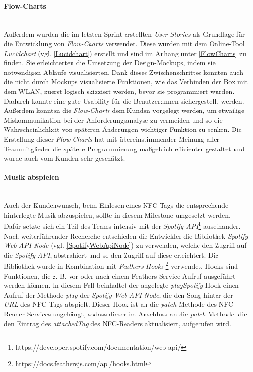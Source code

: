\documentclass[10pt, a4paper]{article}
\begin{document}
\begin{onehalfspace}
\paragraph*{Flow-Charts} $~$ \\
Außerdem wurden die im letzten Sprint erstellten \textit{User Stories} als Grundlage für die Entwicklung von \textit{Flow-Charts} verwendet.
Diese wurden mit dem Online-Tool \textit{Lucidchart} (vgl. \autoref*{Lucidchart}) erstellt und sind im Anhang unter \autoref*{FlowCharts} zu finden.
Sie erleichterten die Umsetzung der Design-Mockups, indem sie notwendigen Abläufe visualisierten.
Dank dieses Zwischenschrittes konnten auch die nicht durch Mockups visualisierte Funktionen, wie das Verbinden der Box mit dem WLAN, zuerst logisch skizziert
werden, bevor sie programmiert wurden. Dadurch konnte eine gute Usability
für die Benutzer:innen sichergestellt werden. Außerdem konnten die \textit{Flow-Charts} dem Kunden vorgelegt werden, um etwailige Miskommunikation bei der Anforderungsanalyse zu vermeiden
und so die Wahrscheinlichkeit von späteren Änderungen wichtiger Funktion zu senken. Die Erstellung dieser \textit{Flow-Charts} hat mit übereinstimmender
Meinung aller Teammitglieder die spätere Programmierung maßgeblich effizienter gestaltet und wurde auch vom Kunden sehr geschätzt.


\paragraph*{Musik abspielen} $~$ \\
Auch der Kundenwunsch, beim Einlesen eines NFC-Tags die entsprechende hinterlegte Musik abzuspielen, sollte in diesem Milestone umgesetzt werden.
Dafür setzte sich ein Teil des Teams intensiv mit der \textit{Spotify-API}\footnote{https://developer.spotify.com/documentation/web-api/} auseinander.
Nach weiterführender Recherche entschieden die Entwickler die Bibliothek \textit{Spotify Web API Node} (vgl. \autoref*{SpotifyWebApiNode}) zu verwenden, welche den Zugriff auf die \textit{Spotify-API},
abstrahiert und so den Zugriff auf diese erleichtert. Die Bibliothek wurde in Kombination mit \textit{Feathers-Hooks}
\footnote{https://docs.feathersjs.com/api/hooks.html} verwendet. Hooks sind Funktionen, die z. B. vor oder nach einem Feathers Service Aufruf ausgeführt werden
können. In diesem Fall beinhaltet der angelegte \textit{playSpotify} Hook einen Aufruf der Methode \textit{play} der \textit{Spotify Web API Node}, die den Song
hinter der \textit{URL} des NFC-Tags abspielt. Dieser Hook ist an die \textit{patch} Methode des NFC-Reader Services angehängt, sodass dieser im
Anschluss an die \textit{patch} Methode, die den Eintrag des \textit{attachedTag} des NFC-Readers aktualisiert, aufgerufen wird.


\end{onehalfspace}
\end{document}

